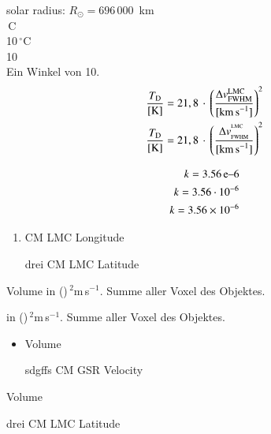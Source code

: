 solar radius: $R_\odot = 696\,000$~km\\




\,\textdegree{}C\\
10\,$^\circ$C\\			%
10\,\textcelsius\\
Ein Winkel von 10\textdegree.\\

\begin{align}
	\frac{T_\text{D}}{[\text{K}]} &= 21,8\,\cdot\,\left( \frac{\Delta v_\text{FWHM}^\text{LMC}}{[\text{km\,s}^{-1}]} \right)^2\\
	\frac{T_\text{D}}{[\text{K}]} &= 21,8\,\cdot\,\left( \frac{\Delta v_{{}_\text{FWHM}}^{{}^\text{LMC}}}{[\text{km\,s}^{-1}]} \right)^2
\end{align}

\begin{align}
	k = 3.56 \text{\,e--6}\\
	k = 3.56 \cdot 10^{-6}\\
	k = 3.56 \times 10^{-6}
\end{align}

\begin{enumerate}
	\item CM LMC Longitude
	\item [drei] CM LMC Latitude
\end{enumerate}

\begin{description}
  	\item Volume in (\textdegree)\,$^2$m\,s$^{-1}$. Summe aller Voxel des Objektes.
  	\item [Volume] in (\textdegree)\,$^2$m\,s$^{-1}$. Summe aller Voxel des Objektes.
\end{description}

\begin{itemize}
 	\item Volume
	\item [sdgffs] CM GSR Velocity
\end{itemize}

\begin{list}{asdf}{}
 	\item Volume
	\item [drei] CM LMC Latitude
\end{list}

